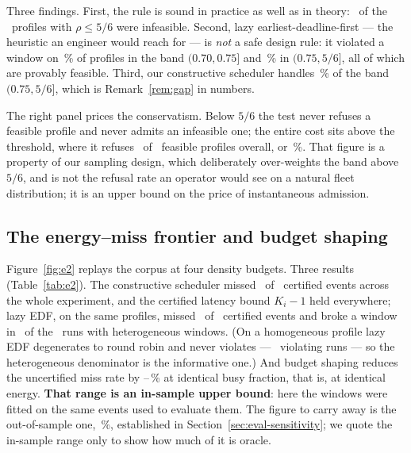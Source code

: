 \documentclass[final,5p,times,twocolumn]{elsarticle}
\theoremstyle{definition}
\newcommand{\Ki}{K_i}
\newcommand{\dens}{\rho}
\begin{document}
Three findings. First, the rule is sound in practice as well as in theory:
\numEoneBelowUnsched\ of the \numEoneBelowN\ profiles with $\dens\le5/6$ were infeasible.
Second, lazy earliest-deadline-first --- the heuristic an engineer would reach for --- is
\emph{not} a safe design rule: it violated a window on \numEoneEdfSeventyPct\,\% of profiles in
the band $(0.70,0.75]$ and \numEoneEdfEightPct\,\% in $(0.75,5/6]$, all of which are provably
feasible. Third, our constructive scheduler handles \numEoneHarmEightPct\,\% of the band
$(0.75,5/6]$, which is Remark~\ref{rem:gap} in numbers.

The right panel prices the conservatism. Below $5/6$ the test never refuses a feasible profile and
never admits an infeasible one; the entire cost sits above the threshold, where it refuses
\numConservRefused\ of \numConservSched\ feasible profiles overall, or \numConservPct\,\%. That
figure is a property of our sampling design, which deliberately over-weights the band above $5/6$,
and is not the refusal rate an operator would see on a natural fleet distribution; it is an upper
bound on the price of instantaneous admission.

\subsection{The energy--miss frontier and budget shaping}\label{sec:eval-frontier}
Figure~\ref{fig:e2} replays the corpus at four density budgets. Three results
(Table~\ref{tab:e2}). The constructive scheduler missed \numEtwoCertMissed\ of
\numEtwoCertTotal\ certified events across the whole experiment, and the certified latency bound
$\Ki-1$ held everywhere; lazy EDF, on the same profiles, missed \numEtwoEdfCertMissed\ of
\numEtwoEdfCertTotal\ certified events and broke a window in \numEtwoEdfHetViolRuns\ of the
\numEtwoEdfHetRuns\ runs with heterogeneous windows. (On a homogeneous profile lazy EDF
degenerates to round robin and never violates --- \numEtwoEdfUnifViolRuns\ violating runs ---
so the heterogeneous denominator is the informative one.) And
budget shaping reduces the uncertified miss rate by
\numEtwoGainMinPct--\numEtwoGainMaxPct\,\% at identical busy fraction, that is, at identical
energy. \textbf{That range is an in-sample upper bound}: here the windows were fitted on the same
events used to evaluate them. The figure to carry away is the out-of-sample one,
\numHoldoutGain\,\%, established in Section~\ref{sec:eval-sensitivity}; we quote the in-sample
range only to show how much of it is oracle.
\end{document}
